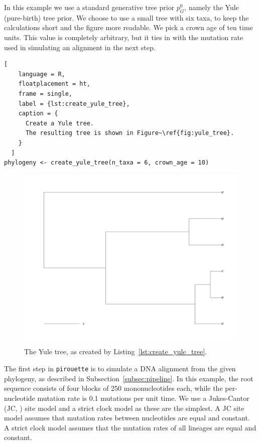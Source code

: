 In this example we use a standard generative tree prior $\mathit{p_{G}^0}$, 
namely the Yule (pure-birth) tree prior. 
We choose to use a small tree with six taxa, to keep
the calculations short and the figure more readable.
We pick a crown age of ten time units. This value is 
completely arbitrary, but it ties in with the mutation rate 
used in simulating an alignment in the next step.

\begin{lstlisting}[
    language = R,
    floatplacement = ht,
    frame = single, 
    label = {lst:create_yule_tree}, 
    caption = {
      Create a Yule tree. 
      The resulting tree is shown in Figure~\ref{fig:yule_tree}.
    }
  ]
phylogeny <- create_yule_tree(n_taxa = 6, crown_age = 10)
\end{lstlisting}

\begin{figure}[ht]
  \includegraphics[width=\textwidth]{example_1/true_tree.png}
  \caption{The Yule tree, as created by Listing~\ref{lst:create_yule_tree}.}
  \label{fig:yule_tree}
\end{figure}

The first step in \verb;pirouette; is to simulate a DNA alignment from the 
given phylogeny, as described in Subsection~\ref{subsec:pipeline}.
In this example, the root sequence consists of four blocks of 250 
mononucleotides each, while the per-nucleotide mutation rate is 
0.1 mutations per unit time.
We use a Jukes-Cantor (JC, \cite{jukes1969evolution}) site model
and a strict clock model as these are the simplest.
A JC site model assumes that mutation rates between nucleotides are equal and 
constant. 
A strict clock model assumes that the mutation rates 
of all lineages are equal and constant.

